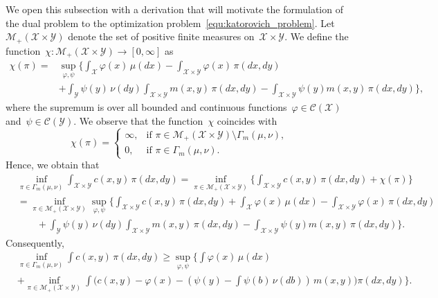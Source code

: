 \documentclass{article}
\theoremstyle{definition}
\def\cC{\mathcal{C}}
\begin{document}
We open this subsection with a derivation that will motivate the formulation of the dual problem to the optimization problem~\eqref{equ:katorovich_problem}. 
Let~$ \mathcal{M}_+ (\mathcal{X} \times \mathcal{Y})$ denote the set of positive finite measures on~$\mathcal{X} \times \mathcal{Y}$. We define the function~$\chi: \mathcal{M}_+ (\mathcal{X} \times \mathcal{Y}) \to [0, \infty]$ as
\begin{align*}
  \chi(\pi)
=&\sup_{\varphi,\psi}\Biggl\{
\int_{\mathcal{X}}\varphi(x)\,\mu(dx)-\int_{\mathcal{X} \times \mathcal{Y}} \varphi(x)\,\pi(dx,dy)
\\
&+\int_{\mathcal{Y}}\psi(y)\,\nu(dy)
\int_{\mathcal{X}\times \mathcal{Y}}m(x,y)\,\pi(dx,dy)
-\int_{\mathcal{X} \times \mathcal{Y}}\psi(y)m(x,y)\,\pi(dx,dy)
\Biggr\},
\end{align*}
where the supremum is over all bounded and continuous functions~$\varphi \in \cC(\mathcal{X})$ and~$\psi \in \cC(\mathcal{Y})$. We observe that the function~$\chi$ coincides with 
\begin{equation}\label{equ:def_chi}
\chi(\pi)=
\begin{cases}\infty, & \text{if } \pi\in\mathcal{M}_+(\mathcal{X}\times 
\mathcal{Y})\setminus\Gamma_{m}(\mu,\nu),\\[1mm]
0, & \text{if } \pi\in\Gamma_{m}(\mu,\nu).
\end{cases}
\end{equation}
Hence, we obtain that 
\begin{align*}
  & \inf_{\pi\in\Gamma_{m}(\mu,\nu)}\int_{\mathcal{X} \times \mathcal{Y}}c(x,y)\,\pi(dx,dy)
 =\inf_{\pi\in\mathcal{M}_+(\mathcal{X} \times \mathcal{Y})}\Biggl\{
\int_{\mathcal{X} \times \mathcal{Y}}c(x,y)\,\pi(dx,dy)+\chi (\pi) \Biggr\} \\
 & =\inf_{\pi \in \mathcal{M}_+(\mathcal{X} \times \mathcal{Y})  }\sup_{\varphi ,\psi}\Biggl\{
 \int_{\mathcal{X} \times \mathcal{Y}}c(x,y)\,\pi(dx,dy) +\int_{\mathcal{X}}\varphi(x)\,\mu(dx) -\int_{\mathcal{X} \times \mathcal{Y}}\varphi(x)\,\pi(dx,dy)\\
 & \qquad  +\int_{\mathcal{Y}}\psi(y)\,\nu(dy)
 \int_{\mathcal{X}\times \mathcal{Y}}m(x,y)\,\pi(dx,dy)
 -\int_{\mathcal{X} \times \mathcal{Y}}\psi(y)m(x,y)\,\pi(dx,dy)
 \Biggr\}. 
\end{align*}
Consequently, 
\begin{align} \label{equ:KP_larger_dual_last_step}
&\inf_{\pi\in\Gamma_{m}(\mu,\nu)}\int c(x,y)\,\pi(dx,dy)
\geq \sup_{\varphi, \psi }\Biggl\{
\int \varphi(x)\,\mu(dx) 
\\ 
&+\inf_{\pi\in\mathcal{M}_+(\mathcal{X} \times \mathcal{Y})}\int \Biggr( c(x,y)  -\varphi(x)-
\left(\psi(y) - \int \psi(b)\,\nu(db) \right) \,m(x,y)
\Biggr)\pi(dx,dy)
\Biggr\}. \nonumber
\end{align}
\end{document}
